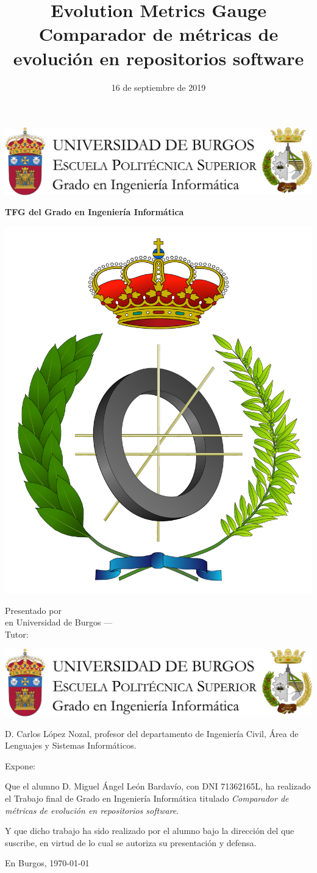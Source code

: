 \documentclass[a4paper,12pt,twoside]{memoir}
\title{{\Huge Evolution Metrics Gauge}\\[0.5cm]Comparador de métricas de evolución en repositorios software}
\author{\nombre}
\date{16 de septiembre de 2019}
\makeatletter
\def\maketitle{
  \null
  \thispagestyle{empty}
\noindent\includegraphics[width=\textwidth]{cabecera}\vspace{1cm}%
  \vfill
  \colorbox{cpardoBox}{%
    \begin{minipage}{.8\textwidth}
      \vspace{.5cm}\Large
      \begin{center}
      \textbf{TFG del Grado en Ingeniería Informática}\vspace{.6cm}\\
      \textbf{\LARGE\@title{}}
      \end{center}
      \vspace{.2cm}
    \end{minipage}

  }%
  \hfill\begin{minipage}{.20\textwidth}
    \includegraphics[width=\textwidth]{escudoInfor}
  \end{minipage}
  \vfill
  \begin{center}%
  {%
    \noindent\LARGE
    Presentado por \@author{}\\ 
    en Universidad de Burgos --- \@date{}\\
    Tutor: \@tutor{}\\
  }%
  \end{center}%
  \null
  \cleardoublepage
  }
\newcommand{\nombre}{Miguel Ángel León Bardavío} %
\makeatother
\begin{document}
\maketitle


\newpage\null\thispagestyle{empty}\newpage


\thispagestyle{empty}


\noindent\includegraphics[width=\textwidth]{cabecera}\vspace{1cm}

\noindent D. Carlos López Nozal, profesor del departamento de Ingeniería Civil, Área de Lenguajes y Sistemas Informáticos.

\noindent Expone:

\noindent Que el alumno D. \nombre, con DNI 71362165L, ha realizado el Trabajo final de Grado en Ingeniería Informática titulado \textit{Comparador de métricas de evolución en repositorios software}. 

\noindent Y que dicho trabajo ha sido realizado por el alumno bajo la dirección del que suscribe, en virtud de lo cual se autoriza su presentación y defensa.

\begin{center} %
En Burgos, {\large \today}
\end{center}

\vfill\vfill\vfill

%
\end{document}

